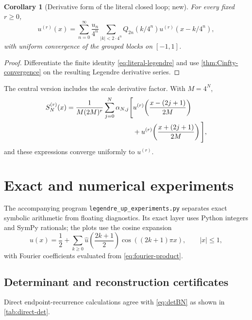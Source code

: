 \documentclass[11pt,oneside]{article}
\numberwithin{equation}{section}
\newtheorem{corollary}[theorem]{Corollary}
\theoremstyle{definition}
\theoremstyle{remark}
\begin{document}
\begin{corollary}[Derivative form of the literal closed loop; new]
\label{cor:derivative-literal-loop}
For every fixed $r\ge0$,
\begin{equation}
 \boxed{
 u^{(r)}(x)=\sum_{n=0}^{\infty}\frac{u_n}{4^n}
 \sum_{|k|<2\cdot4^n}Q_{2n}(k/4^n)u^{(r)}(x-k/4^n),}
 \label{eq:derivative-literal-loop}
\end{equation}
with uniform convergence of the grouped blocks on $[-1,1]$.
\end{corollary}

\begin{proof}
Differentiate the finite identity \eqref{eq:literal-legendre} and use
\cref{thm:Cinfty-convergence} on the resulting Legendre derivative series.
\end{proof}

The central version includes the scale derivative factor.  With $M=4^N$,
\begin{align}
 S_N^{(r)}(x)=\frac1{M(2M)^r}\sum_{j=0}^{N}\alpha_{N,j}
 \Bigg[&u^{(r)}\!\left(\frac{x-(2j+1)}{2M}\right)\notag\\
 &+u^{(r)}\!\left(\frac{x+(2j+1)}{2M}\right)\Bigg],
 \label{eq:central-derivative-loop}
\end{align}
and these expressions converge uniformly to $u^{(r)}$.

\section{Exact and numerical experiments}
\label{sec:numerics}

The accompanying program \texttt{legendre\_up\_experiments.py} separates exact
symbolic arithmetic from floating diagnostics.  Its exact layer uses Python
integers and SymPy rationals; the plots use the cosine expansion
\begin{equation}
 u(x)=\frac12+\sum_{k\ge0}\widehat u\!\left(\frac{2k+1}{2}\right)
 \cos((2k+1)\pi x),\qquad |x|\le1,
 \label{eq:up-cosine}
\end{equation}
with Fourier coefficients evaluated from \eqref{eq:fourier-product}.

\subsection{Determinant and reconstruction certificates}

Direct endpoint-recurrence calculations agree with
\eqref{eq:detBN} as shown in \cref{tab:direct-det}.
\end{document}
